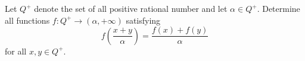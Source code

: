 Let $Q^+$ denote the set of all positive rational number and let $\alpha\in Q^+.$ Determine all functions $f:Q^+ \to (\alpha,+\infty )$  satisfying $$f(\frac{ x+y}{\alpha}) =\frac{ f(x)+f(y)}{\alpha}$$for all $x,y\in Q^+ .$